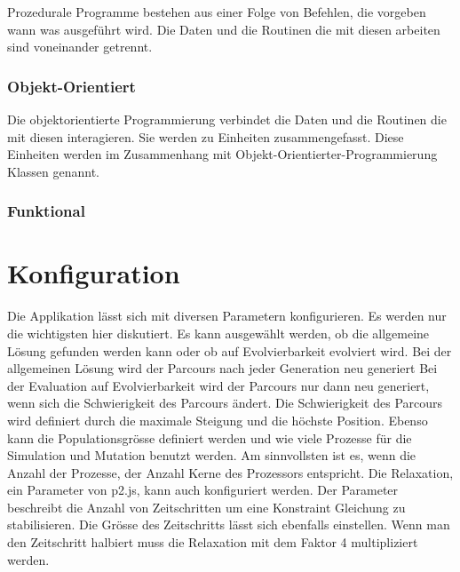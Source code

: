         Prozedurale Programme bestehen aus einer Folge von Befehlen,
        die vorgeben wann was ausgeführt wird.
        Die Daten und die Routinen die mit diesen arbeiten sind voneinander getrennt.

      \subsubsection{Objekt-Orientiert\label{subsub:TechnologyParadigmaObjectOriented}}

        Die objektorientierte Programmierung verbindet die Daten und
        die Routinen die mit diesen interagieren. Sie werden zu Einheiten zusammengefasst.
        Diese Einheiten werden im Zusammenhang mit Objekt-Orientierter-Programmierung Klassen genannt.

      \subsubsection{Funktional\label{subsub:TechnologyParadigmaFunctional}}


  \section{Konfiguration\label{sec:Konfiguration}}

    Die Applikation lässt sich mit diversen Parametern konfigurieren.
    Es werden nur die wichtigsten hier diskutiert.
    Es kann ausgewählt werden, ob die allgemeine Lösung gefunden werden kann oder
    ob auf Evolvierbarkeit evolviert wird. Bei der allgemeinen Lösung wird der Parcours
    nach jeder Generation neu generiert Bei der Evaluation auf Evolvierbarkeit
    wird der Parcours nur dann neu generiert, wenn sich die Schwierigkeit des Parcours ändert.
    Die Schwierigkeit des Parcours wird definiert durch die maximale Steigung und die höchste Position.
    Ebenso kann die Populationsgrösse definiert werden und wie viele Prozesse für die Simulation und Mutation benutzt werden.
    Am sinnvollsten ist es, wenn die Anzahl der Prozesse, der Anzahl Kerne des Prozessors entspricht.
    Die Relaxation, ein Parameter von p2.js, kann auch konfiguriert werden.
    Der Parameter beschreibt die Anzahl von Zeitschritten um eine Konstraint Gleichung zu stabilisieren.
    Die Grösse des Zeitschritts lässt sich ebenfalls einstellen.
    Wenn man den Zeitschritt halbiert muss die Relaxation mit dem
    Faktor 4 multipliziert werden.

